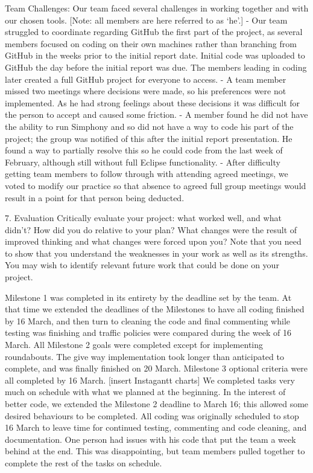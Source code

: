\documentclass[11pt]{article}
\begin{document}
Team Challenges:
Our team faced several challenges in working together and with our chosen tools. [Note: all members are here referred to as ‘he’.] 
- Our team struggled to coordinate regarding GitHub the first part of the project, as several members focused on coding on their own machines rather than branching from GitHub in the weeks prior to the initial report date. Initial code was uploaded to GitHub the day before the initial report was due. The members leading in coding later created a full GitHub project for everyone to access. 
- A team member missed two meetings where decisions were made, so his preferences were not implemented. As he had strong feelings about these decisions it was difficult for the person to accept and caused some friction.
- A member found he did not have the ability to run Simphony and so did not have a way to code his part of the project; the group was notified of this after the initial report presentation. He found a way to partially resolve this so he could code from the last week of February, although still without full Eclipse functionality. 
- After difficulty getting team members to follow through with attending agreed meetings, we voted to modify our practice so that absence to agreed full group meetings would result in a point for that person being deducted.

7. Evaluation Critically evaluate your project: what worked well, and what didn’t? How did you do relative to your plan? What changes were the result of improved thinking and what changes were forced upon you? Note that you need to show that you understand the weaknesses in your work as well as its strengths. You may wish to identify relevant future work that could be done on your project.

Milestone 1 was completed in its entirety by the deadline set by the team. At that time we extended the deadlines of the Milestones to have all coding finished by 16 March, and then turn to cleaning the code and final commenting while testing was finishing and traffic policies were compared during the week of 16 March.
All Milestone 2 goals were completed except for implementing roundabouts. The give way implementation took longer than anticipated to complete, and was finally finished on 20 March.
Milestone 3 optional criteria were all completed by 16 March. 
[insert Instagantt charts] We completed tasks very much on schedule with what we planned at the beginning. In the interest of better code, we extended the Milestone 2 deadline to March 16; this allowed some desired behaviours to be completed. All coding was originally scheduled to stop 16 March to leave time for continued testing, commenting and code cleaning, and documentation. 
One person had issues with his code that put the team a week behind at the end. This was disappointing, but team members pulled together to complete the rest of the tasks on schedule.
\end{document}

